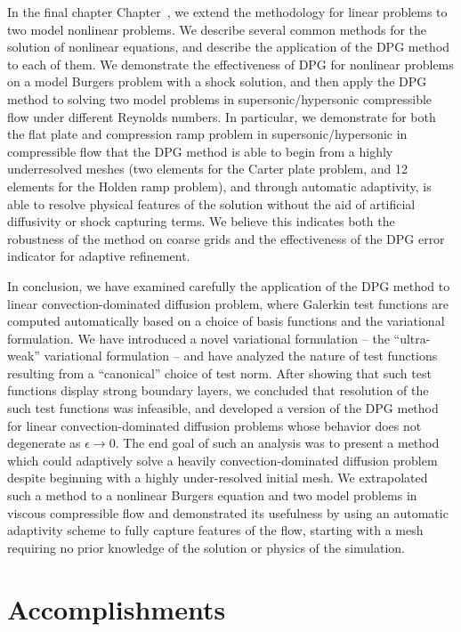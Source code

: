 In the final chapter Chapter~, we extend the methodology for linear problems to two model nonlinear problems.  We describe several common methods for the solution of nonlinear equations, and describe the application of the DPG method to each of them.   We demonstrate the effectiveness of DPG for nonlinear problems on a model Burgers problem with a shock solution, and then apply the DPG method to solving two model problems in supersonic/hypersonic compressible flow under different Reynolds numbers.  In particular, we demonstrate for both the flat plate and compression ramp problem in supersonic/hypersonic in compressible flow that the DPG method is able to begin from a highly underresolved meshes (two elements for the Carter plate problem, and 12 elements for the Holden ramp problem), and through automatic adaptivity, is able to resolve physical features of the solution without the aid of artificial diffusivity or shock capturing terms.  We believe this indicates both the robustness of the method on coarse grids and the effectiveness of the DPG error indicator for adaptive refinement.  

In conclusion, we have examined carefully the application of the DPG method to linear convection-dominated diffusion problem, where Galerkin test functions are computed automatically based on a choice of basis functions and the variational formulation.  We have introduced a novel variational formulation -- the ``ultra-weak'' variational formulation -- and have analyzed the nature of test functions resulting from a ``canonical'' choice of test norm.  After showing that such test functions display strong boundary layers, we concluded that resolution of the such test functions was infeasible, and developed a version of the DPG method for linear convection-dominated diffusion problems whose behavior does not degenerate as $\epsilon \rightarrow 0$.  The end goal of such an analysis was to present a method which could adaptively solve a heavily convection-dominated diffusion problem despite beginning with a highly under-resolved initial mesh.  We extrapolated such a method to a nonlinear Burgers equation and two model problems in viscous compressible flow and demonstrated its usefulness by using an automatic adaptivity scheme to fully capture features of the flow, starting with a mesh requiring no prior knowledge of the solution or physics of the simulation.

\section{Accomplishments}


